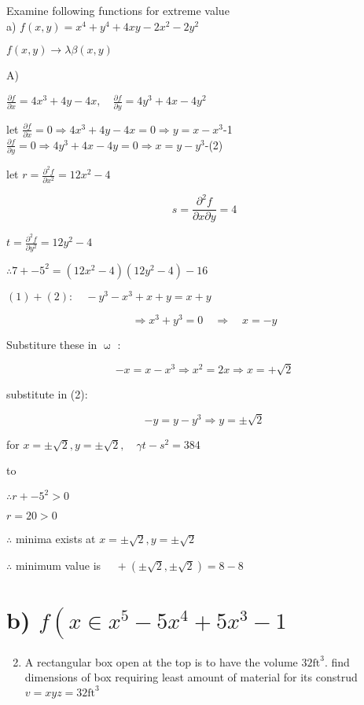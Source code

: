 \documentclass[12pt, a4paper]{article}
\begin{document}
Examine following functions for extreme value\\
a) $f(x, y)=x^{4}+y^{4}+4 x y-2 x^{2}-2 y^{2}$

$f(x, y) \rightarrow \lambda \beta(x, y)$

A)

$\frac{\partial f}{\partial x}=4 x^{3}+4 y-4 x, \quad \frac{\partial f}{\partial y}=4 y^{3}+4 x-4 y^{2}$

let $\frac{\partial f}{\partial x}=0 \Rightarrow 4 x^{3}+4 y-4 x=0 \Rightarrow y=x-x^{3}$-1 $\frac{\partial f}{\partial y}=0 \Rightarrow 4 y^{3}+4 x-4 y=0 \Rightarrow x=y-y^{3}$-(2)

let $r=\frac{\partial^{2} f}{\partial x^{2}}=12 x^{2}-4$

$$
s=\frac{\partial^{2} f}{\partial x \partial y}=4
$$

$t=\frac{\partial^{2} f}{\partial y^{2}}=12 y^{2}-4$

$\therefore 7+-5^{2}=\left(12 x^{2}-4\right)\left(12 y^{2}-4\right)-16$

$(1)+(2): \quad-y^{3}-x^{3}+x+y=x+y$

$$
\Rightarrow x^{3}+y^{3}=0 \quad \Rightarrow \quad x=-y
$$

Substiture these in $\operatorname{\omega }$ :

$$
-x=x-x^{3} \Rightarrow x^{2}=2 x \Rightarrow x=+\sqrt{2}
$$

substitute in (2):

$$
-y=y-y^{3} \Rightarrow y= \pm \sqrt{2}
$$

for $x= \pm \sqrt{2}, y= \pm \sqrt{2}, \quad \gamma t-s^{2}=384$

to

$\therefore r+-5^{2}>0$

$r=20>0$

$\therefore$ minima exists at $x= \pm \sqrt{2}, y= \pm \sqrt{2}$

$\therefore$ minimum value is $\quad+( \pm \sqrt{2}, \pm \sqrt{2})=8-8$

\section*{b) $f\left(x \in x^{5}-5 x^{4}+5 x^{3}-1\right.$}
\begin{enumerate}
  \setcounter{enumi}{1}
  \item A rectangular box open at the top is to have the volume $32 \mathrm{ft}^{3}$. find dimensions of box requiring least amount of material for its construd $v=x y z=32 \mathrm{ft}^{3}$
\end{enumerate}
\end{document}
